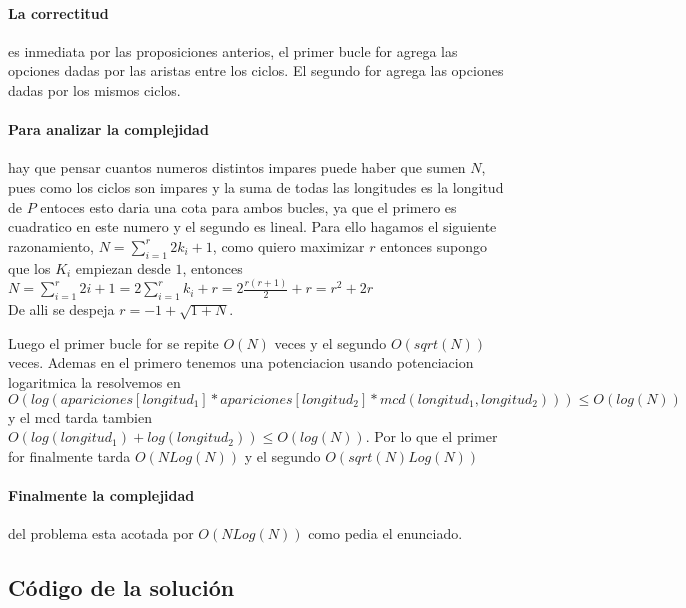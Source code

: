 	\paragraph{La correctitud} es inmediata por las proposiciones anterios,
el primer bucle for agrega las opciones dadas por las aristas entre los
ciclos. El segundo for agrega las opciones dadas por los mismos ciclos.
	\paragraph{Para analizar la complejidad} hay que pensar cuantos
numeros distintos impares puede haber que sumen $N$, pues como los ciclos
son impares y la suma de todas las longitudes es la longitud de $P$ entoces
esto daria una cota para ambos bucles, ya que el primero es cuadratico
en este numero y el segundo es lineal. Para ello hagamos el siguiente 
razonamiento, $N=\sum_{i=1}^{r}2k_i+1$, como quiero maximizar $r$ entonces
supongo que los $K_i$ empiezan desde $1$, entonces\\
\begin{math}
	N=\sum_{i=1}^{r}2i+1=2\sum_{i=1}^{r}k_i+r=2\frac{r(r+1)}{2}+r=r^2+2r
\end{math}\\
	De alli se despeja $r=-1+\sqrt{1+N}$.
	
	
	Luego el primer bucle for se repite $O(N)$ veces y el segundo $O(sqrt(N))$
veces. Ademas en el primero tenemos una potenciacion usando potenciacion
logaritmica la resolvemos en $O(log(apariciones[longitud_1]*apariciones[longitud_2]*mcd(longitud_1,longitud_2)))\leq O(log(N))$ y el mcd
tarda tambien $O(log(longitud_1)+log(longitud_2))\leq O(log(N))$. Por lo que el primer for
finalmente tarda $O(NLog(N))$ y el segundo $O(sqrt(N)Log(N))$

	\paragraph{Finalmente la complejidad} del problema esta acotada
por $O(NLog(N))$ como pedia el enunciado.

\subsection{Código de la solución}
\lstset{inputencoding=utf8/latin1}

